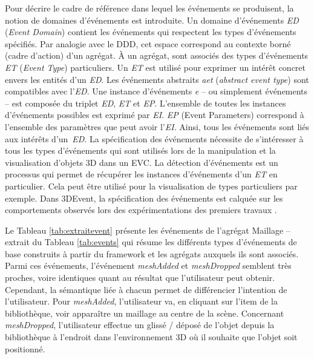 Pour décrire le cadre de référence dans lequel les événements se produisent, la 
notion de domaines d'événements est introduite. Un domaine d'événements 
\textit{ED} (\textit{Event Domain}) contient les événements qui respectent les types 
d'événements spécifiés. Par analogie avec le \gls{DDD}, cet 
espace correspond au contexte borné (cadre d'action) d'un agrégat. À un agrégat, 
sont associés des types d'événements \textit{ET} (\textit{Event Type}) particuliers. 
Un \textit{ET} est utilisé pour exprimer un intérêt concret envers les entités d'un 
\textit{ED}. 
Les événements abstraits \textit{aet} (\textit{abstract event type}) sont 
compatibles avec l'\textit{ED}. 
Une instance d'événements \textit{e} -- ou simplement 
événements -- est composée du triplet \textit{ED}, \textit{ET} et \textit{EP}. 
L'ensemble de toutes les instances d'événements possibles est exprimé par 
\textit{EI}. \textit{EP} (Event Parameters) correspond à l'ensemble des paramètres 
que peut avoir l'\textit{EI}. Ainsi, tous les événements sont liés aux intérêts 
d'un~\textit{ED}. La spécification des événements nécessite de 
s'intéresser à tous les types d'événements qui sont utilisés lors de la manipulation 
et la visualisation d'objets \gls{3D} dans un \gls{EVC}. La détection d'événements 
est un processus qui permet de récupérer les instances d'événements d'un 
\textit{ET} en particulier. Cela peut être utilisé pour la visualisation de types
particuliers par exemple. Dans 3DEvent, la spécification des événements est calquée 
sur les comportements observés lors des expérimentations des premiers travaux 
\cite{Desprat2015a, Desprat2015b}. 

Le Tableau \ref{tab:extraitevent}
présente les événements de l'agrégat Maillage -- extrait du Tableau 
\ref{tab:events} qui résume les 
différents types d'événements de base construits à partir du \gls{framework} et les 
agrégats auxquels ils sont associés. Parmi ces événements, l'événement 
\textit{meshAdded} et \textit{meshDropped} semblent très proches, voire 
identiques quant au résultat que l'utilisateur peut obtenir. Cependant, la 
sémantique liée à chacun permet de différencier l'intention de l'utilisateur. 
Pour \textit{meshAdded}, l'utilisateur va, en cliquant sur l'item de la bibliothèque, 
voir apparaître un maillage au centre de la scène. 
Concernant \textit{meshDropped}, 
l'utilisateur effectue un glissé / déposé de l'objet depuis la bibliothèque 
à l'endroit dans l'environnement 3D où il souhaite que l'objet soit positionné.



